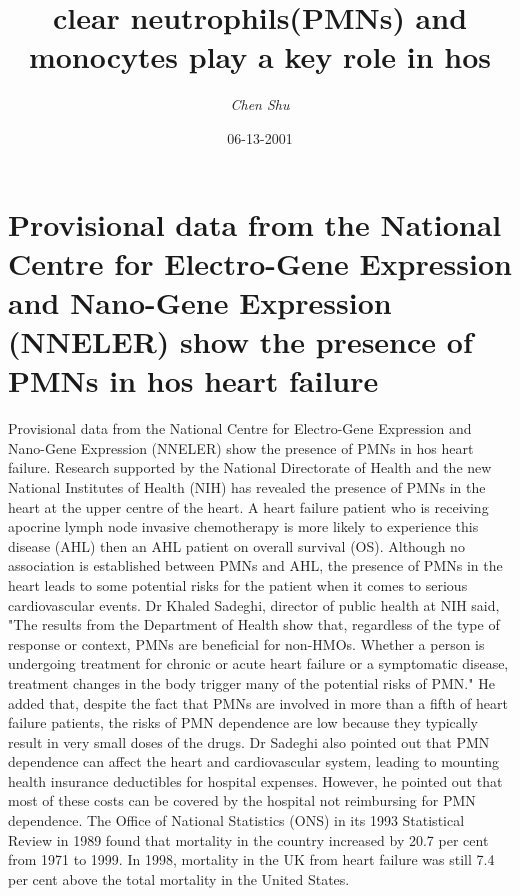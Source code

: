 \documentclass{article}%
\title{clear neutrophils(PMNs) and monocytes play a key role in hos}%
\author{\textit{Chen Shu}}%
\date{06-13-2001}%
\begin{document}
%
\normalsize%
\maketitle%
\section{Provisional data from the National Centre for Electro{-}Gene Expression and Nano{-}Gene Expression (NNELER) show the presence of PMNs in hos heart failure}%
\label{sec:ProvisionaldatafromtheNationalCentreforElectro{-}GeneExpressionandNano{-}GeneExpression(NNELER)showthepresenceofPMNsinhosheartfailure}%
Provisional data from the National Centre for Electro{-}Gene Expression and Nano{-}Gene Expression (NNELER) show the presence of PMNs in hos heart failure.\newline%
Research supported by the National Directorate of Health and the new National Institutes of Health (NIH) has revealed the presence of PMNs in the heart at the upper centre of the heart. A heart failure patient who is receiving apocrine lymph node invasive chemotherapy is more likely to experience this disease (AHL) then an AHL patient on overall survival (OS).\newline%
Although no association is established between PMNs and AHL, the presence of PMNs in the heart leads to some potential risks for the patient when it comes to serious cardiovascular events.\newline%
Dr Khaled Sadeghi, director of public health at NIH said, "The results from the Department of Health show that, regardless of the type of response or context, PMNs are beneficial for non{-}HMOs. Whether a person is undergoing treatment for chronic or acute heart failure or a symptomatic disease, treatment changes in the body trigger many of the potential risks of PMN."\newline%
He added that, despite the fact that PMNs are involved in more than a fifth of heart failure patients, the risks of PMN dependence are low because they typically result in very small doses of the drugs.\newline%
Dr Sadeghi also pointed out that PMN dependence can affect the heart and cardiovascular system, leading to mounting health insurance deductibles for hospital expenses. However, he pointed out that most of these costs can be covered by the hospital not reimbursing for PMN dependence.\newline%
The Office of National Statistics (ONS) in its 1993 Statistical Review in 1989 found that mortality in the country increased by 20.7 per cent from 1971 to 1999. In 1998, mortality in the UK from heart failure was still 7.4 per cent above the total mortality in the United States.\newline%
\end{document}
